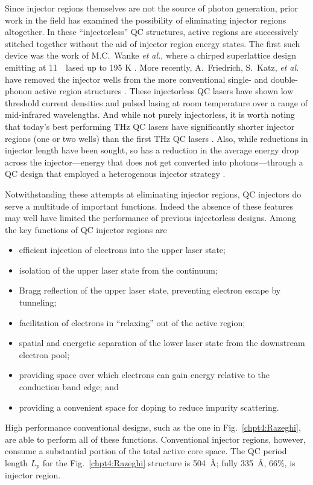 Since injector regions themselves are not the source of photon generation, prior work in the field has examined the possibility of eliminating injector regions altogether.  In these ``injectorless'' QC structures, active regions are successively stitched together without the aid of injector region energy states.  The first such device was the work of M.C.~Wanke \textit{et al.}, where a chirped superlattice design emitting at 11~\um\ lased up to 195 K \cite{Wanke:APL:2001}.  More recently, A.\ Friedrich, S.\ Katz, \textit{et al.} have removed the injector wells from the more conventional single- and double-phonon active region structures \cite{Friedrch:SST:2007} \cite{Katz:APL:2008}.  These injectorless QC lasers have shown low threshold current densities and pulsed lasing at room temperature over a range of mid-infrared wavelengths.  And while not purely injectorless, it is worth noting that today's best performing THz QC lasers \cite{Luo:APL:2007} \cite{Belkin:OptExp:2008} have significantly shorter injector regions (one or two wells) than the first THz QC lasers \cite{Kohler:Nature:2002}.  Also, while reductions in injector length have been sought, so has a reduction in the average energy drop across the injector---energy that does not get converted into photons---through a QC design that employed a heterogenous injector strategy \cite{Hoffman:OptExp:2007}.

Notwithstanding these attempts at eliminating injector regions, QC injectors do serve a multitude of important functions.  Indeed the absence of these features may well have limited the performance of previous injectorless designs.  Among the key functions of QC injector regions are
\begin{itemize}
  \setlength{\itemsep}{0pt}
\item efficient injection of electrons into the upper laser state;
\item isolation of the upper laser state from the continuum;
\item Bragg reflection of the upper laser state, preventing electron escape by tunneling;
\item facilitation of electrons in ``relaxing'' out of the active region;
\item spatial and energetic separation of the lower laser state from the downstream electron pool;
\item providing space over which electrons can gain energy relative to the conduction band edge; and
\item providing a convenient space for doping to reduce impurity scattering.
\end{itemize}
High performance conventional designs, such as the one in Fig.~\ref{chpt4:Razeghi}, are able to perform all of these functions.  Conventional injector regions, however, consume a substantial portion of the total active core space.  The QC period length $L_p$ for the Fig.~\ref{chpt4:Razeghi} structure is 504~\AA; fully 335~\AA, 66\%, is injector region.

